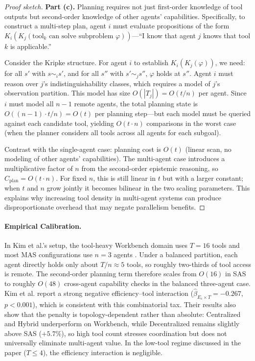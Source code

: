\begin{proof}[Proof sketch]
\textbf{Part (c).} Planning requires not just first-order knowledge of tool outputs but second-order knowledge of other agents' capabilities. Specifically, to construct a multi-step plan, agent $i$ must evaluate propositions of the form $K_i(K_j(\mathrm{tool}_k \text{ can solve subproblem } \varphi))$---``I know that agent $j$ knows that tool $k$ is applicable.''

Consider the Kripke structure. For agent $i$ to establish $K_i(K_j(\varphi))$, we need: for all $s'$ with $s \sim_i s'$, and for all $s''$ with $s' \sim_j s''$, $\varphi$ holds at $s''$. Agent $i$ must reason over $j$'s indistinguishability classes, which requires a model of $j$'s observation partition. This model has size $O(|T_j|) = O(t/n)$ per agent. Since $i$ must model all $n-1$ remote agents, the total planning state is $O((n-1) \cdot t/n) = O(t)$ per planning step---but each model must be queried against each candidate tool, yielding $O(t \cdot n)$ comparisons in the worst case (when the planner considers all tools across all agents for each subgoal).

Contrast with the single-agent case: planning cost is $O(t)$ (linear scan, no modeling of other agents' capabilities). The multi-agent case introduces a multiplicative factor of $n$ from the second-order epistemic reasoning, so $C_{\mathrm{plan}} = O(t \cdot n)$. For fixed $n$, this is still linear in $t$ but with a larger constant; when $t$ and $n$ grow jointly it becomes bilinear in the two scaling parameters. This explains why increasing tool density in multi-agent systems can produce disproportionate overhead that may negate parallelism benefits.
\end{proof}

\paragraph{Empirical Calibration.} In Kim et al.'s setup, the tool-heavy Workbench domain uses $T = 16$ tools and most MAS configurations use $n = 3$ agents \cite{kim2025scaling}. Under a balanced partition, each agent directly holds only about $T/n \approx 5$ tools, so roughly two-thirds of tool access is remote. The second-order planning term therefore scales from $O(16)$ in SAS to roughly $O(48)$ cross-agent capability checks in the balanced three-agent case. Kim et al. report a strong negative efficiency--tool interaction ($\hat{\beta}_{E_c \times T} = -0.267$, $p < 0.001$), which is consistent with this combinatorial tax. Their results also show that the penalty is topology-dependent rather than absolute: Centralized and Hybrid underperform on Workbench, while Decentralized remains slightly above SAS ($+5.7\%$), so high tool count stresses coordination but does not universally eliminate multi-agent value. In the low-tool regime discussed in the paper ($T \le 4$), the efficiency interaction is negligible.

